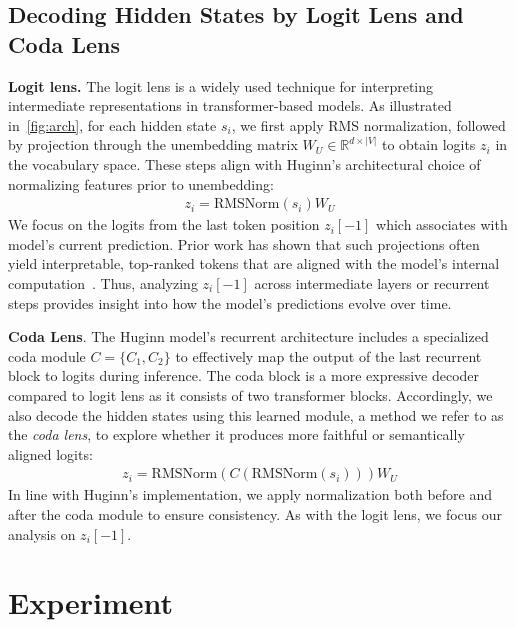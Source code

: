 \documentclass{article} %
\begin{document}
\subsection{Decoding Hidden States by Logit Lens and Coda Lens}
\textbf{Logit lens.} The logit lens is a widely used technique for interpreting intermediate representations in transformer-based models. As illustrated in~\cref{fig:arch}, for each hidden state $s_i$, we first apply RMS normalization, followed by projection through the unembedding matrix $W_U \in \mathbb{R}^{d \times |V|}$ to obtain logits $z_i$ in the vocabulary space. These steps align with Huginn's architectural choice of normalizing features prior to unembedding:
\begin{align}
    z_i = \mathrm{RMSNorm}(s_i) W_U
\end{align}
 We focus on the logits from the last token position $z_i[-1]$ which associates with model's current prediction. Prior work has shown that such projections often yield interpretable, top-ranked tokens that are aligned with the model's internal computation~\citep{geva-etal-2023-dissecting, geva-etal-2022-transformer}. Thus, analyzing $z_i[-1]$ across intermediate layers or recurrent steps provides insight into how the model's predictions evolve over time.

\textbf{Coda Lens}. The Huginn model's recurrent architecture includes a specialized coda module $C = \{C_1, C_2\}$ to effectively map the output of the last recurrent block to logits during inference. The coda block is a more expressive decoder compared to logit lens as it consists of two transformer blocks. Accordingly, we also decode the hidden states using this learned module, a method we refer to as the \textit{coda lens}, to explore whether it produces more faithful or semantically aligned logits:
\begin{align}
    z_i = \mathrm{RMSNorm}(C(\mathrm{RMSNorm}(s_i))) W_U
\end{align}
In line with Huginn's implementation, we apply normalization both before and after the coda module to ensure consistency. As with the logit lens, we focus our analysis on $z_i[-1]$.


\section{Experiment}
\end{document}
